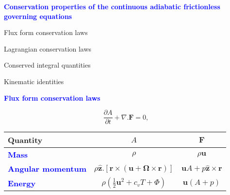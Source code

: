 \documentclass[a4]{seminar}
\newcommand{\B}[1]{\textcolor{blue}{#1}}
\begin{document}
\begin{slide}

\B{\bf Conservation properties of the continuous
adiabatic frictionless governing equations}

\vspace{4mm}

Flux form conservation laws

\vspace{3mm}

Lagrangian conservation laws

\vspace{3mm}

Conserved integral quantities

\vspace{3mm}

Kinematic identities


\end{slide}


\begin{slide}

\B{\bf Flux form conservation laws}

\begin{displaymath}
\frac{\partial A}{\partial t}+\nabla .\mathbf{F}=0,
\end{displaymath}

\vspace{3mm}

\begin{tabular}{|l|cc|}
\hline
Quantity
&
\( A \)
&
\( \mathbf{F} \)
\\
\hline
\hline
\B{\bf Mass}
&
\( \rho \)
&
\( \rho \mathbf{u} \)
\\
\hline
\B{\bf Angular momentum}
&
\( \rho \widehat{\mathbf{z}}.\left[ \mathbf{r}\times
\left( \mathbf{u}+\boldsymbol{\Omega} \times \mathbf{r}\right) \right] \)
&
\( \mathbf{u}A+p\widehat{\mathbf{z}}\times \mathbf{r} \)
\\
\hline
\B{\bf Energy}
&
\( \rho \left( \frac{1}{2}\mathbf{u}^{2}+c_{v}T+\Phi \right)  \)
&
\( \mathbf{u}\left( A+p\right) \)
\\
\hline
\end{tabular}



\end{slide}

\end{document}
